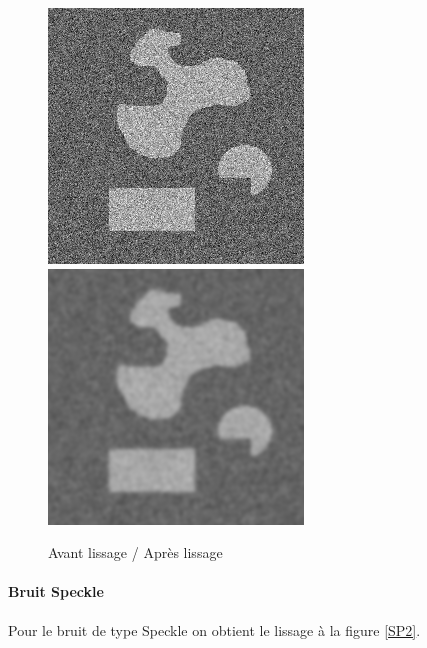 \documentclass[paper=a4, fontsize=11pt]{scrartcl} %
\begin{document}
\begin{figure}[h!]
\caption{Avant lissage / Après lissage}
\label{BB2}
\centering
\includegraphics[scale=0.6]{images/rapport/bb/formes2bb30.png} 
\includegraphics[scale=0.6]{images/rapport/bb/bb30.png} 
\end{figure}

\paragraph{Bruit Speckle}
Pour le bruit de type Speckle on obtient le lissage à la figure \ref{SP2}.
\end{document}
